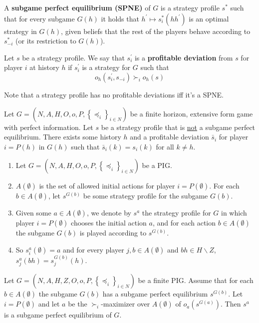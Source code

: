 \documentclass[11pt]{elegantbook}
\begin{document}
\begin{definition}
    \normalfont
    A \textbf{subgame perfect equilibrium (SPNE)} of $G$ is a strategy profile $s^*$ such that for every subgame $G(h)$ it holds that $h^{\prime} \mapsto s_i^*\left(h h^{\prime}\right)$ is an optimal strategy in $G(h)$, given beliefs that the rest of the players behave according to $s_{-i}^*$ (or its restriction to $G(h)$).
\end{definition}

\begin{definition}
    \normalfont
    Let $s$ be a strategy profile. We say that $s_i^{\prime}$ is a \textbf{profitable deviation} from $s$ for player $i$ at history $h$ if $s_i^{\prime}$ is a strategy for $G$ such that
    $$
    o_h\left(s_i^{\prime}, s_{-i}\right) \succ_i o_h(s)
    $$
\end{definition}
Note that a strategy profile has no profitable deviations iff it's a SPNE.

\begin{theorem}
    Let $G=\left(N, A, H, O, o, P,\left\{\preceq_i\right\}_{i \in N}\right)$ be a finite horizon, extensive form game with perfect information. Let $s$ be a strategy profile that is \underline{not} a subgame perfect equilibrium. There exists some history $h$ and a profitable deviation $\bar{s}_i$ for player $i=P(h)$ in $G(h)$ such that $\bar{s}_i(k)=s_i(k)$ for all $k \neq h$.
\end{theorem}
\begin{enumerate}[$\circ$]
    \item Let $G=\left(N, A, H, O, o, P,\left\{\preceq_i\right\}_{i \in N}\right)$ be a PIG.
    \item $A(\emptyset)$ is the set of allowed initial actions for player $i=P(\emptyset)$. For each $b \in A(\emptyset)$, let $s^{G(b)}$ be some strategy profile for the subgame $G(b)$.
    \item Given some $a \in A(\emptyset)$, we denote by $s^a$ the strategy profile for $G$ in which player $i=P(\emptyset)$ chooses the initial action $a$, and for each action $b \in A(\emptyset)$ the subgame $G(b)$ is played according to $s^{G(b)}$.
    \item So $s_i^a(\emptyset)=a$ and for every player $j, b \in A(\emptyset)$ and $b h \in H \backslash Z$, $s_j^a(b h)=s_j^{G(b)}(h)$.
\end{enumerate}
\begin{lemma}
    Let $G=\left(N, A, H, Z, O, o, P,\left\{\preceq_i\right\}_{i \in N}\right)$ be a finite PIG. Assume that for each $b \in A(\emptyset)$ the subgame $G(b)$ has a subgame perfect equilibrium $s^{G(b)}$. Let $i=P(\emptyset)$ and let $a$ be the $\succ_i$-maximizer over $A(\emptyset)$ of $o_a\left(s^{G(a)}\right)$. Then $s^a$ is a subgame perfect equilibrium of $G$.
\end{lemma}
\end{document}
